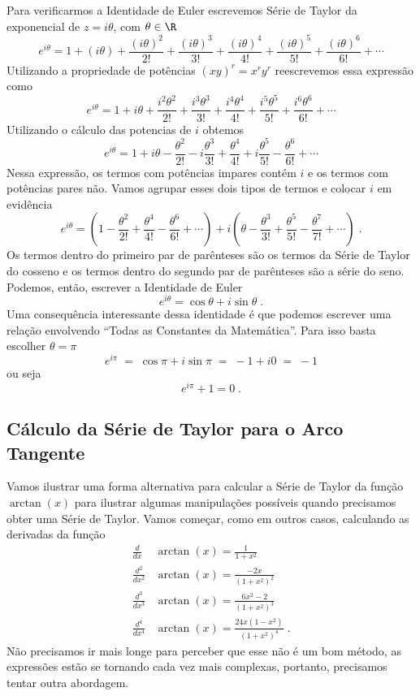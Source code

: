 Para verificarmos a Identidade de Euler escrevemos Série de Taylor
da exponencial de $z=i\theta$, com $\theta\in\R$
\[
  e^{i\theta}
    = 1 + (i\theta)
    + \frac{(i\theta)^2}{2!}
    + \frac{(i\theta)^3}{3!}
    + \frac{(i\theta)^4}{4!}
    + \frac{(i\theta)^5}{5!}
    + \frac{(i\theta)^6}{6!}
    + \cdots
\]
Utilizando a propriedade de potências $(xy)^r = x^r y^r$ reescrevemos essa expressão como
\[
  e^{i\theta}
    = 1 + i\theta
    + \frac{i^2\theta^2}{2!}
    + \frac{i^3\theta^3}{3!}
    + \frac{i^4\theta^4}{4!}
    + \frac{i^5\theta^5}{5!}
    + \frac{i^6\theta^6}{6!}
    + \cdots
\]
Utilizando o cálculo das potencias de $i$ obtemos
\[
  e^{i\theta}
    = 1
    + i\theta
    -  \frac{\theta^2}{2!}
    - i\frac{\theta^3}{3!}
    +  \frac{\theta^4}{4!}
    + i\frac{\theta^5}{5!}
    -  \frac{\theta^6}{6!}
    +  \cdots
\]
Nessa expressão, os termos com potências impares contém $i$ e os termos
com potências pares não. Vamos agrupar esses dois tipos de termos
e colocar $i$ em evidência
\[
  e^{i\theta}
    = \left(
        1
        - \frac{\theta^2}{2!}
        + \frac{\theta^4}{4!}
        - \frac{\theta^6}{6!}
        + \cdots
      \right)
    + i \left(
          \theta
          - \frac{\theta^3}{3!}
          + \frac{\theta^5}{5!}
          - \frac{\theta^7}{7!}
          + \cdots
        \right)   \;.
\]
Os termos dentro do primeiro par de parênteses
são os termos da Série de Taylor do cosseno e os termos
dentro do segundo par de parênteses são a série do seno.
Podemos, então, escrever a Identidade de Euler
\[
  e^{i\theta} = \cos\theta + i\sin\theta   \;.
\]
Uma consequência interessante dessa identidade é que podemos escrever
uma relação envolvendo ``Todas as Constantes da Matemática''.
Para isso basta escolher $\theta=\pi$
\[
  e^{i\pi} \;=\; \cos\pi + i\sin\pi \;=\; -1 + i0 \;=\; -1
\]
ou seja
\[
  e^{i\pi} + 1 = 0   \;.
\]

\subsection{Cálculo da Série de Taylor para o Arco Tangente}

Vamos ilustrar uma forma alternativa para calcular a Série de Taylor da
função $\arctan(x)$ para ilustrar algumas manipulações possíveis
quando precisamos obter uma Série de Taylor.
Vamos começar, como em outros casos, calculando as derivadas da função
\begin{align*}
  \frac{d}{dx}     & \arctan(x) = \frac{1}{1+x^2}                     \\[3mm]
  \frac{d^2}{dx^2} & \arctan(x) = \frac{-2x}{(1+x^2)^2}               \\[3mm]
  \frac{d^3}{dx^3} & \arctan(x) = \frac{6x^2-2}{(1+x^2)^3}            \\[3mm]
  \frac{d^4}{dx^4} & \arctan(x) = \frac{24x(1-x^2)}{(1+x^2)^4}   \;.
\end{align*}
Não precisamos ir mais longe para perceber que esse não é um bom método,
as expressões estão se tornando cada vez mais complexas,
portanto, precisamos tentar outra abordagem.

